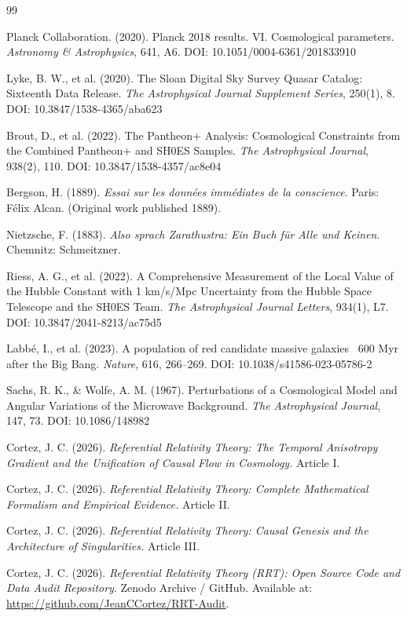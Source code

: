 \documentclass[12pt, a4paper]{article}
\begin{document}
\begin{thebibliography}{99}

Planck Collaboration. (2020). Planck 2018 results. VI. Cosmological parameters. \textit{Astronomy \& Astrophysics}, 641, A6. DOI: 10.1051/0004-6361/201833910

Lyke, B. W., et al. (2020). The Sloan Digital Sky Survey Quasar Catalog: Sixteenth Data Release. \textit{The Astrophysical Journal Supplement Series}, 250(1), 8. DOI: 10.3847/1538-4365/aba623

Brout, D., et al. (2022). The Pantheon+ Analysis: Cosmological Constraints from the Combined Pantheon+ and SH0ES Samples. \textit{The Astrophysical Journal}, 938(2), 110. DOI: 10.3847/1538-4357/ac8e04

Bergson, H. (1889). \textit{Essai sur les données immédiates de la conscience}. Paris: Félix Alcan. (Original work published 1889).

Nietzsche, F. (1883). \textit{Also sprach Zarathustra: Ein Buch für Alle und Keinen}. Chemnitz: Schmeitzner.

Riess, A. G., et al. (2022). A Comprehensive Measurement of the Local Value of the Hubble Constant with 1 km/s/Mpc Uncertainty from the Hubble Space Telescope and the SH0ES Team. \textit{The Astrophysical Journal Letters}, 934(1), L7. DOI: 10.3847/2041-8213/ac75d5

Labbé, I., et al. (2023). A population of red candidate massive galaxies ~600 Myr after the Big Bang. \textit{Nature}, 616, 266–269. DOI: 10.1038/s41586-023-05786-2

Sachs, R. K., \& Wolfe, A. M. (1967). Perturbations of a Cosmological Model and Angular Variations of the Microwave Background. \textit{The Astrophysical Journal}, 147, 73. DOI: 10.1086/148982

Cortez, J. C. (2026). \textit{Referential Relativity Theory: The Temporal Anisotropy Gradient and the Unification of Causal Flow in Cosmology.} Article I.

Cortez, J. C. (2026). \textit{Referential Relativity Theory: Complete Mathematical Formalism and Empirical Evidence.} Article II.

Cortez, J. C. (2026). \textit{Referential Relativity Theory: Causal Genesis and the Architecture of Singularities.} Article III.

Cortez, J. C. (2026). \textit{Referential Relativity Theory (RRT): Open Source Code and Data Audit Repository}. Zenodo Archive / GitHub. Available at: \url{https://github.com/JeanCCortez/RRT-Audit}.

\end{thebibliography}
\end{document}
